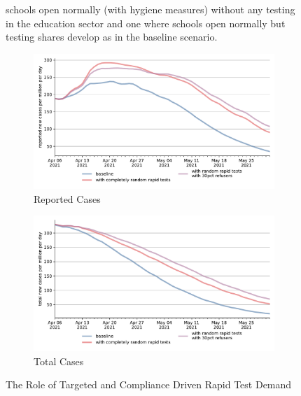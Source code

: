 \begin{figure}[ht]
{   schools open normally (with hygiene measures) without any testing in the education
   sector and one where schools open normally but testing shares develop as in the
   baseline scenario.
   }
\end{figure}


\begin{figure}[ht] %
  \centering
  \begin{subfigure}[b]{.49\textwidth}
    \centering
    \includegraphics[width=0.9 \textwidth]{figures/results/figures/scenario_comparisons/random_rapid_tests_vs_baseline/full_new_known_case}
    \caption{Reported Cases}
    \label{fig:random_rapid_tests_new_known_case}
  \end{subfigure}%
  \hfill
  \begin{subfigure}[b]{.49\textwidth}
    \centering
    \includegraphics[width=0.9 \textwidth]{figures/results/figures/scenario_comparisons/random_rapid_tests_vs_baseline/full_newly_infected}
    \caption{Total Cases}
    \label{fig:random_rapid_tests_newly_infected}
  \end{subfigure}
  \caption{The Role of Targeted and Compliance Driven Rapid Test Demand}
  \label{fig:random_rapid_tests_detailed}
\end{figure}

